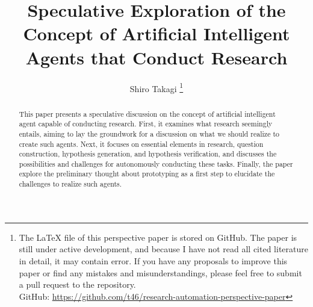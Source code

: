 \documentclass{article}
\title{Speculative Exploration of the Concept of Artificial Intelligent Agents that Conduct Research}
\author{Shiro Takagi \footnote{The LaTeX file of this perspective paper is stored on GitHub. The paper is still under active development, and because I have not read all cited literature in detail, it may contain error. If you have any proposals to improve this paper or find any mistakes and misunderstandings, please feel free to submit a pull request to the repository. \\ GitHub: \href{https://github.com/t46/research-automation-perspective-paper}{https://github.com/t46/research-automation-perspective-paper} }}
\begin{document}
\sloppy
\maketitle

\begin{abstract}
This paper presents a speculative discussion on the concept of artificial intelligent agent capable of conducting research. First, it examines what research seemingly entails, aiming to lay the groundwork for a discussion on what we should realize to create such agents. Next, it focuses on essential elements in research, question construction, hypothesis generation, and hypothesis verification, and discusses the possibilities and challenges for autonomously conducting these tasks. Finally, the paper explore the preliminary thought about prototyping as a first step to elucidate the challenges to realize such agents.
\end{abstract}

\tableofcontents




% 
% 
% 



% 


\appendix

\end{document}
